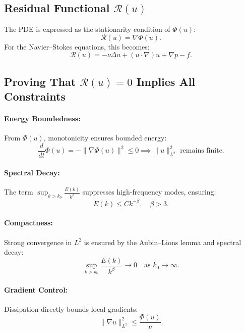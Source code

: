 \subsection{Residual Functional \(\mathcal{R}(u)\)}
The PDE is expressed as the stationarity condition of \(\Phi(u)\):
\begin{equation}
\mathcal{R}(u) = \nabla \Phi(u).
\end{equation}
For the Navier--Stokes equations, this becomes:
\begin{equation}
\mathcal{R}(u) = -\nu \Delta u + (u \cdot \nabla) u + \nabla p - f.
\end{equation}

\subsection{Proving That \(\mathcal{R}(u) = 0\) Implies All Constraints}

\paragraph{Energy Boundedness:} From \(\Phi(u)\), monotonicity ensures bounded energy:
\begin{equation}
\frac{d}{dt} \Phi(u) = -\|\nabla \Phi(u)\|^2 \leq 0 \implies \|u\|_{L^2}^2 \text{ remains finite.}
\end{equation}

\paragraph{Spectral Decay:} The term \(\sup_{k > k_0} \frac{E(k)}{k^\beta}\) suppresses high-frequency modes, ensuring:
\begin{equation}
E(k) \leq C k^{-\beta}, \quad \beta > 3.
\end{equation}

\paragraph{Compactness:} Strong convergence in \(L^2\) is ensured by the Aubin--Lions lemma and spectral decay:
\begin{equation}
\sup_{k > k_0} \frac{E(k)}{k^\beta} \to 0 \quad \text{as } k_0 \to \infty.
\end{equation}

\paragraph{Gradient Control:} Dissipation directly bounds local gradients:
\begin{equation}
\|\nabla u\|_{L^2}^2 \leq \frac{\Phi(u)}{\nu}.
\end{equation}

